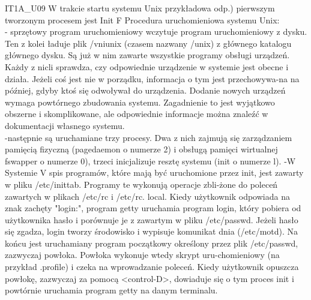 \answer
{ IT1A\_U09 W trakcie startu systemu Unix}
{przykładowa odp.) pierwszym tworzonym procesem jest Init}
{F}
{}
{
Procedura uruchomieniowa systemu Unix: \\
- sprzętowy program uruchomieniowy wczytuje program uruchomieniowy z dysku. Ten z kolei ładuje plik /vniunix (czasem nazwany /unix) z głównego katalogu głównego dysku. Są już w nim zawarte wszystkie programy obsługi urządzeń. Każdy z nicli sprawdza, czy odpowiednie urządzenie w systemie jest obecne i działa. Jeżeli coś jest nie w porządku, informacja o tym jest przechowywa-na na później, gdyby ktoś się odwoływał do urządzenia. Dodanie nowych urządzeń wymaga powtórnego zbudowania systemu. Zagadnienie to jest wyjątkowo obszerne i skomplikowane, ale odpowiednie informacje można znaleźć w dokumentacji własnego systemu.
\\
-następnie są uruchamiane trzy procesy. Dwa z nich zajmują się zarządzaniem pamięcią fizyczną (pagedaemon o numerze 2) i obsługą pamięci wirtualnej fswapper o numerze 0), trzeci inicjalizuje resztę systemu (init o numerze l).
-W Systemie V spis programów, które mają być uruchomione przez init, jest zawarty w pliku /etc/inittab. Programy te wykonują operacje zbli-żone do poleceń zawartych w plikach /etc/rc i /etc/rc. local. Kiedy użytkownik odpowiada na znak zachęty "login:", program getty uruchamia program login, który pobiera od użytkownika hasło i porównuje je z zawartym w pliku /etc/passwd. Jeżeli hasło się zgadza, login tworzy środowisko i wypisuje komunikat dnia (/etc/motd). Na końcu jest uruchamiany program początkowy określony przez plik /etc/passwd, zazwyczaj powłoka. Powłoka wykonuje wtedy skrypt uru-chomieniowy (na przykład .profile) i czeka na wprowadzanie poleceń. Kiedy użytkownik opuszcza powłokę, zazwyczaj za pomocą <control-D>, dowiaduje się o tym proces init i powtórnie uruchamia program getty na danym terminalu.
}

